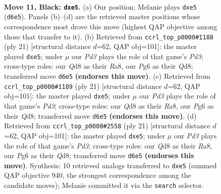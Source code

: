 \documentclass[11pt]{article}
\begin{document}
\clearpage

\begin{figure}[p]\centering
\begin{subfigure}{0.46\textwidth}\centering
\resizebox{\linewidth}{!}{%
\newchessgame
\chessboard[
  setfen={r1bq1rk1/1pp3bp/p2p1np1/4Np2/PPP4P/6P1/4PPB1/RNBQ1RK1 b - - 0 11},
  showmover=false,
  pgfstyle=straightmove, color=movearrow, markmove={d6-e5}
]}
\caption{}
\end{subfigure}\hfill
\begin{subfigure}{0.46\textwidth}\centering
\resizebox{\linewidth}{!}{%
\newchessgame
\chessboard[
  setfen={r1bq1rk1/2p1bppp/p2p1n2/4N3/Pp2P3/1B6/1PP2PPP/RNBQR1K1 b - - 0 11},
  showmover=false,
  pgfstyle=straightmove, color=movearrow, markmove={d6-e5}
]}
\caption{}
\end{subfigure}
\\[4pt]
\begin{subfigure}{0.46\textwidth}\centering
\resizebox{\linewidth}{!}{%
\newchessgame
\chessboard[
  setfen={r1bq1rk1/2p1bppp/p2p1n2/4N3/Pp2P3/1B6/1PP2PPP/RNBQR1K1 b - - 0 11},
  showmover=false,
  pgfstyle=straightmove, color=movearrow, markmove={d6-e5}
]}
\caption{}
\end{subfigure}\hfill
\begin{subfigure}{0.46\textwidth}\centering
\resizebox{\linewidth}{!}{%
\newchessgame
\chessboard[
  setfen={r1bq1rk1/2p1bppp/p2p1n2/4N3/Pp2P3/1B6/1PP2PPP/RNBQR1K1 b - - 0 11},
  showmover=false,
  pgfstyle=straightmove, color=movearrow, markmove={d6-e5}
]}
\caption{}
\end{subfigure}
\caption{\textbf{Move 11, Black: \texttt{dxe5}.} (a) Our position; Melanie plays \texttt{dxe5} (\texttt{d6e5}). Panels (b)--(d) are the retrieved master positions whose correspondence most drove this move (highest QAP objective among those that transfer to it). (b) Retrieved from \texttt{ccrl\_top\_p0000\#1188} (ply 21) [structural distance $d$=62, QAP obj=101]: the master played \texttt{dxe5}; under $\mu$ our \emph{Pd3} plays the role of that game's \emph{Pd3}; cross-type roles: our \emph{Q}d8 as their \emph{R}a8, our \emph{P}g6 as their \emph{Q}d8; transferred move \texttt{d6e5} \textbf{(endorses this move)}. (c) Retrieved from \texttt{ccrl\_top\_p0000\#1189} (ply 21) [structural distance $d$=62, QAP obj=101]: the master played \texttt{dxe5}; under $\mu$ our \emph{Pd3} plays the role of that game's \emph{Pd3}; cross-type roles: our \emph{Q}d8 as their \emph{R}a8, our \emph{P}g6 as their \emph{Q}d8; transferred move \texttt{d6e5} \textbf{(endorses this move)}. (d) Retrieved from \texttt{ccrl\_top\_p0000\#2558} (ply 21) [structural distance $d$=62, QAP obj=101]: the master played \texttt{dxe5}; under $\mu$ our \emph{Pd3} plays the role of that game's \emph{Pd3}; cross-type roles: our \emph{Q}d8 as their \emph{R}a8, our \emph{P}g6 as their \emph{Q}d8; transferred move \texttt{d6e5} \textbf{(endorses this move)}. Synthesis: 10 retrieved analogs transferred to \texttt{dxe5} (summed QAP objective 940, the strongest correspondence among the candidate moves); Melanie committed it via the \texttt{search} selector.}
\label{fig:thought-m21}
\end{figure}
\end{document}
